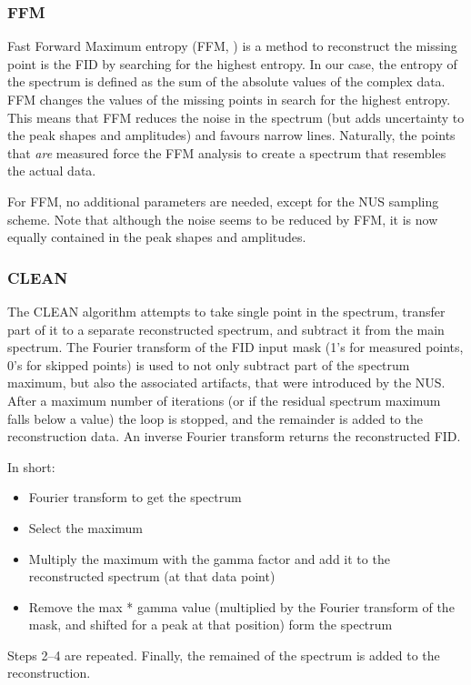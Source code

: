 \documentclass[11pt,a4paper]{article}
\begin{document}
\subsubsection{FFM}
Fast Forward Maximum entropy (FFM, \cite{balsgart2012fast}) is a method to reconstruct the missing point is the FID by searching for the highest entropy.
In our case, the entropy of the spectrum is defined as the sum of the absolute values of the complex data.
FFM changes the values of the missing points in search for the highest entropy.
This means that FFM reduces the noise in the spectrum (but adds uncertainty to the peak shapes and amplitudes) and favours narrow lines.
Naturally, the points that \textit{are} measured force the FFM analysis to create a spectrum that resembles the actual data.

For FFM, no additional parameters are needed, except for the NUS sampling scheme.
Note that although the noise seems to be reduced by FFM, it is now equally contained in the peak shapes and amplitudes.

\subsubsection{CLEAN}
The CLEAN algorithm attempts to take single point in the spectrum, transfer part of it to a separate reconstructed spectrum, and subtract it from the main spectrum.
The Fourier transform of the FID input mask (1's for measured points, 0's for skipped points) is used to not only subtract part of the spectrum maximum, but also the
associated artifacts, that were introduced by the NUS. After a maximum number of iterations (or if the residual spectrum maximum falls below a value) the
loop is stopped, and the remainder is added to the reconstruction data. An inverse Fourier transform returns the reconstructed FID.

In short:
\begin{itemize}
  \item Fourier transform to get the spectrum
	 \item Select the maximum
	 \item Multiply the maximum with the gamma factor and add it to the reconstructed spectrum (at that data point)
	 \item Remove the max * gamma value (multiplied by the Fourier transform of the mask, and shifted for a peak at that position) form the spectrum
\end{itemize}
Steps 2--4 are repeated. Finally, the remained of the spectrum is added to the reconstruction.
\end{document}
